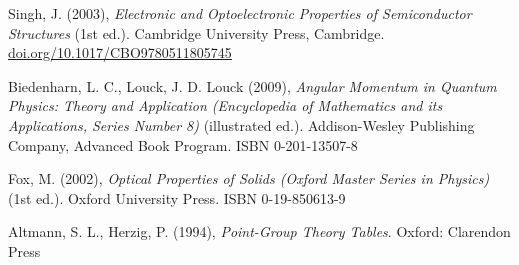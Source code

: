 \documentclass[12pt]{article}
\begin{document}
\begin{thebibliography}{10}
Singh, J. (2003), \textit{Electronic and Optoelectronic Properties of Semiconductor Structures} (1st ed.). Cambridge University Press, Cambridge. \href{https://doi.org/10.1017/CBO9780511805745}{doi.org/10.1017/CBO9780511805745}

Biedenharn, L. C., Louck, J. D. Louck (2009), \textit{Angular Momentum in Quantum Physics: Theory and Application (Encyclopedia of Mathematics and its Applications, Series Number 8)} (illustrated ed.). Addison-Wesley Publishing Company, Advanced Book Program. ISBN 0-201-13507-8

Fox, M. (2002), \textit{Optical Properties of Solids (Oxford Master Series in Physics)} (1st ed.). Oxford University Press. ISBN 0-19-850613-9

Altmann, S. L., Herzig, P. (1994), \textit{Point-Group Theory Tables}. Oxford: Clarendon Press

\end{thebibliography}



%

\endgroup





\end{document}
